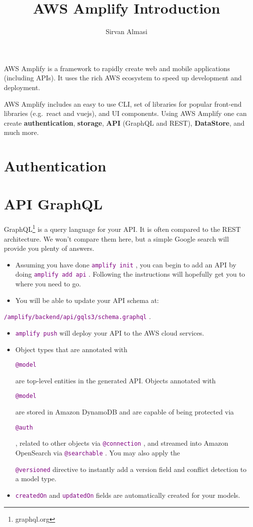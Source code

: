 \documentclass{tufte-handout}
\title{AWS Amplify Introduction}
\author[Sirvan Almasi]{Sirvan Almasi}
\date{}
\makeatletter
\providecommand{\tightlist}{%
  \setlength{\itemsep}{0pt}\setlength{\parskip}{0pt}}
\newcommand{\cde}[1]{
  \textcolor{purple}{\texttt{#1}}
}
\newcommand{\auth}{
  \cde{@auth}
}
\newcommand{\model}{
  \cde{@model}
}
\makeatother
\begin{document}
\maketitle


AWS Amplify\cite{AmplifyFrameworkDocs2021} is a framework to rapidly
create web and mobile applications (including APIs). It uses the rich
AWS ecosystem to speed up development and deployment.

AWS Amplify includes an easy to use CLI, set of libraries for popular
front-end libraries (e.g.~react and vuejs), and UI components. Using AWS
Amplify one can create \textbf{authentication}, \textbf{storage},
\textbf{API} (GraphQL and REST), \textbf{DataStore}, and much more.

\hypertarget{authentication}{%
\section{Authentication}\label{authentication}}

\hypertarget{api-graphql}{%
\section{API GraphQL}\label{api-graphql}}

GraphQL\footnote{graphql.org} is a query language for your API. It is
often compared to the REST architecture. We won't compare them here, but
a simple Google search will provide you plenty of answers.

\begin{itemize}
\tightlist
\item
  Assuming you have done \cde{amplify init}, you can begin to add an API
  by doing \cde{amplify add api}. Following the instructions will
  hopefully get you to where you need to go.
\item
  You will be able to update your API schema at:
\end{itemize}

\cde{/amplify/backend/api/gqls3/schema.graphql}.

\begin{itemize}
\tightlist
\item
  \cde{amplify push} will deploy your API to the AWS cloud services.
\item
  Object types that are annotated with \model are top-level entities in
  the generated API. Objects annotated with \model are stored in Amazon
  DynamoDB and are capable of being protected via \auth, related to
  other objects via \cde{@connection}, and streamed into Amazon
  OpenSearch via \cde{@searchable}. You may also apply the
  \cde{@versioned} directive to instantly add a version field and
  conflict detection to a model type.
\item
  \cde{createdOn} and \cde{updatedOn} fields are automatically created
  for your models.
\end{itemize}
\end{document}
